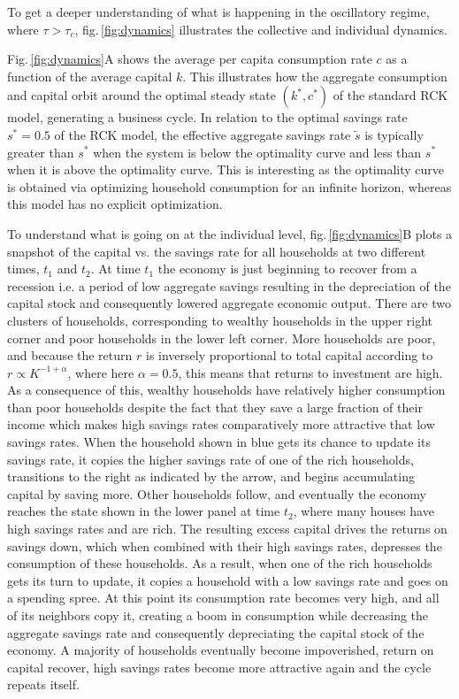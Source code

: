 To get a deeper understanding of what is happening in the oscillatory regime, where $\tau > \tau_{c}$, fig.\,\ref{fig:dynamics} illustrates the collective and individual dynamics.

Fig.\,\ref{fig:dynamics}A shows the average per capita consumption rate $c$ as a function of the average capital $k$. 
This illustrates how the aggregate consumption and capital orbit around the optimal steady state $(k^\ast,c^\ast)$  of the standard RCK model, generating a business cycle.  
In relation to the optimal savings rate $s^\ast \!=\!0.5$ of the RCK model, the effective aggregate savings rate $\tilde{s}$ is typically greater than $s^\ast$ when the system is below the optimality curve and less than $ s^\ast$ when it is above the optimality curve. 
This is interesting as the optimality curve is obtained via optimizing household consumption for an infinite horizon, whereas this model has no explicit optimization.  

To understand what is going on at the individual level, fig.\,\ref{fig:dynamics}B plots a snapshot of the capital vs. the savings rate for all households at two different times, $t_1$ and $t_2$. 
At time $t_1$ the economy is just beginning to recover from a recession i.e. a period of low aggregate savings resulting in the depreciation of the capital stock and consequently lowered aggregate economic output. 
There are two clusters of households, corresponding to wealthy households in the upper right corner and poor households in the lower left corner.
More households are poor, and because the return $r$ is inversely proportional to total capital according to $r \propto K^{-1 + \alpha}$, where here $\alpha = 0.5$, this means that returns to investment are high. 
As a consequence of this, wealthy households have relatively higher consumption than poor households despite the fact that they save a large fraction of their income which makes high savings rates comparatively more attractive that low savings rates. 
When the household shown in blue gets its chance to update its savings rate, it copies the higher savings rate of one of the rich households, transitions to the right as indicated by the arrow, and begins accumulating capital by saving more.
Other households follow, and eventually the economy reaches the state shown in the lower panel at time $t_2$, where many houses have high savings rates and are rich.
The resulting excess capital drives the returns on savings down, which when combined with their high savings rates, depresses the consumption of these households.
As a result, when one of the rich households gets its turn to update, it copies a household with a low savings rate and goes on a spending spree.  
At this point its consumption rate becomes very high, and all of its neighbors copy it, creating a boom in consumption while decreasing the aggregate savings rate and consequently depreciating the capital stock of the economy.
A majority of households eventually become impoverished, return on capital recover, high savings rates become more attractive again and the cycle repeats itself.

